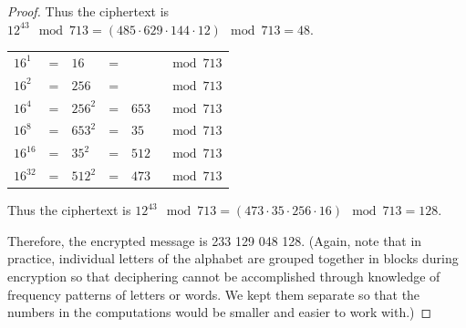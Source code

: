 \documentclass[14pt]{extarticle}
\begin{document}
\begin{proof}
Thus the ciphertext is \(12^{43} \mod 713 = (485 \cdot 629 \cdot 144 \cdot 12) \mod 713 = 48\).

\begin{tabular}{lclcll}
\(16^1\)&=&\(16\)&=&\(\)&\(\mod 713\) \\
\(16^2\)&=&\(256\)&=&\(\)&\(\mod 713\) \\
\(16^4\)&=&\(256^2\)&=&\(653\)&\(\mod 713\) \\
\(16^8\)&=&\(653^2\)&=&\(35\)&\(\mod 713\) \\
\(16^{16}\)&=&\(35^2\)&=&\(512\)&\(\mod 713\) \\
\(16^{32}\)&=&\(512^2\)&=&\(473\)&\(\mod 713\) 
\end{tabular}

Thus the ciphertext is \(12^{43} \mod 713 = (473 \cdot 35 \cdot 256 \cdot 16) \mod 713 = 128\).

Therefore, the encrypted message is 233 129 048 128. (Again, note that in practice, individual letters of the 
alphabet are grouped together in blocks during encryption so that deciphering cannot be accomplished through 
knowledge of frequency patterns of letters or words. We kept them separate so that the numbers in the computations 
would be smaller and easier to work with.)
\end{proof}
\end{document}
